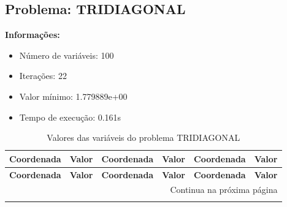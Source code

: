 \documentclass[12pt]{article}
\begin{document}
\newpage            
\subsection{Problema: TRIDIAGONAL}

\textbf{Informações:}
\begin{itemize}
\item Número de variáveis: 100
\item Iterações: 22
\item Valor mínimo: 1.779889e+00
\item Tempo de execução: 0.161s
\end{itemize}

\small
\begin{longtable}{@{}cc|cc|cc@{}}
\caption{Valores das variáveis do problema TRIDIAGONAL} \\
\toprule
\textbf{Coordenada} & \textbf{Valor} & \textbf{Coordenada} & \textbf{Valor} & \textbf{Coordenada} & \textbf{Valor} \\
\midrule
\endfirsthead

\toprule
\textbf{Coordenada} & \textbf{Valor} & \textbf{Coordenada} & \textbf{Valor} & \textbf{Coordenada} & \textbf{Valor} \\
\midrule
\endhead

\midrule \multicolumn{6}{r}{{Continua na próxima página}} \\ \midrule
\endfoot


\end{longtable}
\end{document}
